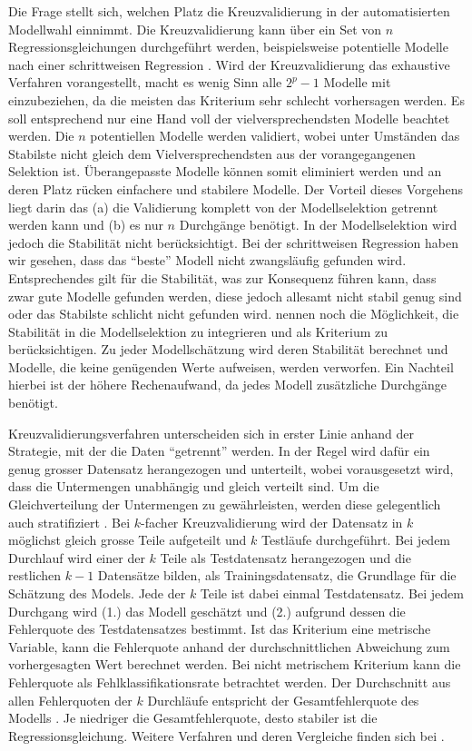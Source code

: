 Die Frage stellt sich, welchen Platz die Kreuzvalidierung in der automatisierten Modellwahl einnimmt.
Die Kreuzvalidierung kann über ein Set von $n$ Regressionsgleichungen durchgeführt werden, beispielsweise  potentielle Modelle nach einer schrittweisen Regression \cite[p. 12]{arlot2010survey}. Wird der Kreuzvalidierung das exhaustive Verfahren vorangestellt, macht es wenig Sinn alle $2^p-1$ Modelle mit einzubeziehen, da die meisten das Kriterium sehr schlecht vorhersagen werden.  Es soll entsprechend nur eine Hand voll der vielversprechendsten Modelle beachtet werden. 
Die $n$ potentiellen Modelle werden validiert, wobei unter Umständen das Stabilste nicht gleich dem Vielversprechendsten aus der vorangegangenen Selektion ist.
Überangepasste Modelle können somit eliminiert werden und an deren Platz rücken einfachere und stabilere Modelle.
Der Vorteil dieses Vorgehens liegt darin das (a) die Validierung komplett von der Modellselektion getrennt werden kann und (b) es nur $n$ Durchgänge benötigt. 
In der Modellselektion wird jedoch die Stabilität nicht berücksichtigt. 
Bei der schrittweisen Regression haben wir gesehen, dass das ``beste'' Modell nicht zwangsläufig gefunden wird.
Entsprechendes gilt für die Stabilität, was zur Konsequenz führen kann, dass zwar gute Modelle gefunden werden, diese jedoch allesamt nicht stabil genug sind oder das Stabilste schlicht nicht gefunden wird. 
 nennen noch die Möglichkeit, die Stabilität in die Modellselektion zu integrieren und als  Kriterium zu berücksichtigen. 
Zu jeder Modellschätzung wird deren Stabilität berechnet und Modelle, die keine genügenden Werte aufweisen, werden verworfen. 
Ein Nachteil hierbei ist der höhere Rechenaufwand, da jedes Modell zusätzliche Durchgänge benötigt. 

Kreuzvalidierungsverfahren unterscheiden sich in erster Linie anhand der Strategie, mit der die Daten ``getrennt'' werden.
In der Regel wird dafür ein genug grosser Datensatz herangezogen und unterteilt, wobei vorausgesetzt wird, dass die Untermengen unabhängig und gleich verteilt sind.
Um die Gleichverteilung der Untermengen zu gewährleisten, werden diese gelegentlich auch stratifiziert \cite{diamantidis2000unsupervised}.
Bei $k$-facher Kreuzvalidierung wird der Datensatz in $k$ möglichst gleich grosse Teile aufgeteilt und $k$ Testläufe durchgeführt. Bei jedem Durchlauf wird einer der $k$ Teile als Testdatensatz herangezogen und die restlichen $k-1$ Datensätze bilden, als Trainingsdatensatz, die Grundlage für die Schätzung des Models. Jede der $k$ Teile ist dabei einmal Testdatensatz. Bei jedem Durchgang wird (1.) das Modell geschätzt und (2.) aufgrund dessen die Fehlerquote des Testdatensatzes bestimmt. Ist das Kriterium eine metrische Variable, kann die Fehlerquote anhand der durchschnittlichen Abweichung zum vorhergesagten Wert berechnet werden. Bei nicht metrischem Kriterium kann die Fehlerquote als Fehlklassifikationsrate betrachtet werden. 
Der Durchschnitt aus allen Fehlerquoten der $k$ Durchläufe entspricht der Gesamtfehlerquote des Modells \cite[p. 14]{arlot2010survey}.
Je niedriger die Gesamtfehlerquote, desto stabiler ist die Regressionsgleichung.
Weitere Verfahren und deren Vergleiche finden sich bei .

